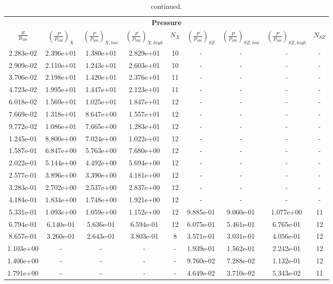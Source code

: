 \documentclass[traditabstract   ]{aa} %
\begin{document}
\begin{appendix}
\begin{table}
\begin{center}
\caption{continued. }
\renewcommand{\arraystretch}{0.95}%

\begin{tabular}{ c c c c c c c c c }
\multicolumn{9}{c}{\bf Pressure} \\
$\frac{R}{R_{500}}$ & $\left( \frac{P}{P_{500}} \right)_{X}$ & $\left( \frac{P}{P_{500}} \right)_{X,low}$ & $\left( \frac{P}{P_{500}} \right)_{X,high}$ & $N_{X}$ & $\left( \frac{P}{P_{500}} \right)_{SZ}$ & $\left( \frac{P}{P_{500}} \right)_{SZ,low}$ & $\left( \frac{P}{P_{500}} \right)_{SZ,high}$ & $N_{SZ}$ \\
\hline
2.283e-02 & 2.396e+01 & 1.380e+01 & 2.829e+01 & 10 & - & - & - & - \\
2.909e-02 & 2.110e+01 & 1.243e+01 & 2.603e+01 & 10 & - & - & - & - \\
3.706e-02 & 2.198e+01 & 1.420e+01 & 2.376e+01 & 11 & - & - & - & - \\
4.723e-02 & 1.995e+01 & 1.447e+01 & 2.123e+01 & 11 & - & - & - & - \\
6.018e-02 & 1.569e+01 & 1.025e+01 & 1.847e+01 & 12 & - & - & - & - \\
7.669e-02 & 1.318e+01 & 8.647e+00 & 1.557e+01 & 12 & - & - & - & - \\
9.772e-02 & 1.086e+01 & 7.665e+00 & 1.283e+01 & 12 & - & - & - & - \\
1.245e-01 & 8.800e+00 & 7.024e+00 & 1.022e+01 & 12 & - & - & - & - \\
1.587e-01 & 6.847e+00 & 5.763e+00 & 7.680e+00 & 12 & - & - & - & - \\
2.022e-01 & 5.144e+00 & 4.492e+00 & 5.694e+00 & 12 & - & - & - & - \\
2.577e-01 & 3.896e+00 & 3.390e+00 & 4.181e+00 & 12 & - & - & - & - \\
3.283e-01 & 2.702e+00 & 2.537e+00 & 2.837e+00 & 12 & - & - & - & - \\
4.184e-01 & 1.834e+00 & 1.748e+00 & 1.921e+00 & 12 & - & - & - & - \\
5.331e-01 & 1.093e+00 & 1.059e+00 & 1.152e+00 & 12 & 9.885e-01 & 9.060e-01 & 1.077e+00 & 11 \\
6.794e-01 & 6.140e-01 & 5.636e-01 & 6.594e-01 & 12 & 6.075e-01 & 5.461e-01 & 6.765e-01 & 12 \\
8.657e-01 & 3.260e-01 & 2.643e-01 & 3.803e-01 & 8 & 3.571e-01 & 3.031e-01 & 4.056e-01 & 12 \\
1.103e+00 & - & - & - & - & 1.939e-01 & 1.562e-01 & 2.242e-01 & 12 \\
1.406e+00 & - & - & - & - & 9.760e-02 & 7.288e-02 & 1.132e-01 & 12 \\
1.791e+00 & - & - & - & - & 4.649e-02 & 3.710e-02 & 5.343e-02 & 11 \\
\hline
\hline
\end{tabular}


\end{center}
\end{table}
\end{appendix}
\end{document}
